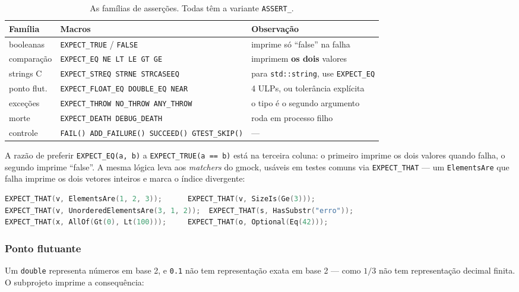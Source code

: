 \begin{table}[htbp]
\centering
\caption{As famílias de asserções. Todas têm a variante \texttt{ASSERT\_}.}
\label{tab:assercoes}
\footnotesize
\begin{tabular}{@{}lll@{}}
\toprule
\textbf{Família} & \textbf{Macros} & \textbf{Observação} \\
\midrule
booleanas   & \texttt{EXPECT\_TRUE} / \texttt{FALSE} & imprime só ``false'' na falha \\
comparação  & \texttt{EXPECT\_EQ NE LT LE GT GE}     & imprimem \textbf{os dois} valores \\
strings C   & \texttt{EXPECT\_STREQ STRNE STRCASEEQ} & para \texttt{std::string}, use \texttt{EXPECT\_EQ} \\
ponto flut. & \texttt{EXPECT\_FLOAT\_EQ DOUBLE\_EQ NEAR} & 4 ULPs, ou tolerância explícita \\
exceções    & \texttt{EXPECT\_THROW NO\_THROW ANY\_THROW} & o tipo é o segundo argumento \\
morte       & \texttt{EXPECT\_DEATH DEBUG\_DEATH}    & roda em processo filho \\
controle    & \texttt{FAIL() ADD\_FAILURE() SUCCEED() GTEST\_SKIP()} & --- \\
\bottomrule
\end{tabular}
\end{table}

A razão de preferir \texttt{EXPECT\_EQ(a, b)} a \texttt{EXPECT\_TRUE(a == b)}
está na terceira coluna: o primeiro imprime os dois valores quando falha, o
segundo imprime ``false''. A mesma lógica leva aos \emph{matchers} do gmock,
usáveis em testes comuns via \texttt{EXPECT\_THAT} --- um \texttt{ElementsAre} que
falha imprime os dois vetores inteiros e marca o índice divergente:

\begin{lstlisting}[style=bt, language=C++,
    caption={\emph{Matchers}: valem sobretudo pela mensagem de falha.}]
EXPECT_THAT(v, ElementsAre(1, 2, 3));      EXPECT_THAT(v, SizeIs(Ge(3)));
EXPECT_THAT(v, UnorderedElementsAre(3, 1, 2));  EXPECT_THAT(s, HasSubstr("erro"));
EXPECT_THAT(x, AllOf(Gt(0), Lt(100)));     EXPECT_THAT(o, Optional(Eq(42)));
\end{lstlisting}

\subsubsection{Ponto flutuante}

Um \texttt{double} representa números em base 2, e \texttt{0.1} não tem
representação exata em base 2 --- como $1/3$ não tem representação decimal
finita. O subprojeto imprime a consequência:

